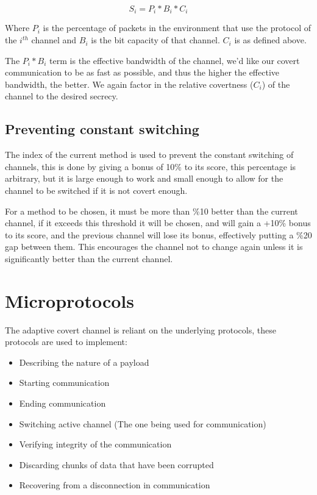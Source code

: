 \begin{equation}
    S_i = P_i * B_i * C_i
\end{equation}

Where $P_i$ is the percentage of packets in the environment that use the protocol of the $i^{th}$ channel and $B_i$ is the bit capacity of that channel. $C_i$ is as defined above.

The $P_i * B_i$ term is the effective bandwidth of the channel, we'd like our covert communication to be as fast as possible, and thus the higher the effective bandwidth, the better. We again factor in the relative covertness ($C_i$) of the channel to the desired secrecy.

\subsection{Preventing constant switching}

The index of the current method is used to prevent the constant switching of channels, this is done by giving a bonus of 10\% to its score, this percentage is arbitrary, but it is large enough to work and small enough to allow for the channel to be switched if it is not covert enough.

For a method to be chosen, it must be more than \%10 better than the current channel, if it exceeds this threshold it will be chosen, and will gain a +10\% bonus to its score, and the previous channel will lose its bonus, effectively putting a \%20 gap between them. This encourages the channel not to change again unless it is significantly better than the current channel.

\section{Microprotocols}
\label{sec:microprotocols}

The adaptive covert channel is reliant on the underlying protocols, these protocols are used to implement:
\begin{itemize}
    \item Describing the nature of a payload
    \item Starting communication
    \item Ending communication
    \item Switching active channel (The one being used for communication)
    \item Verifying integrity of the communication
    \item Discarding chunks of data that have been corrupted
    \item Recovering from a disconnection in communication
\end{itemize}
\label{itm:microprotocols}

